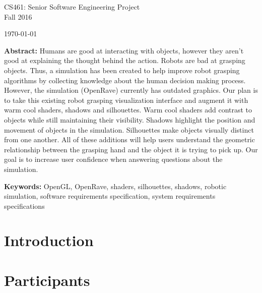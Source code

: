 \documentclass[10pt,journal,compsoc]{IEEEtran}
\begin{document}
\begin{titlepage}
\begin{flushleft}
\begin{bfseries}
\end{bfseries}

\vspace{15mm}
\Large{CS461: Senior Software Engineering Project} \\
\Large{Fall 2016} \\

\vspace{10mm}

\today

\vfill

\begin{large}
{\bf Abstract:}
Humans are good at interacting with objects, however they aren't good at explaining the thought behind the action.
Robots are bad at grasping objects.
Thus, a simulation has been created to help improve robot grasping algorithms by collecting knowledge about the human decision making process.
However, the simulation (OpenRave) currently has outdated graphics.
Our plan is to take this existing robot grasping visualization interface and augment it with warm cool shaders, shadows and silhouettes.
Warm cool shaders add contrast to objects while still maintaining their visibility.
Shadows highlight the position and movement of objects in the simulation.
Silhouettes make objects visually distinct from one another.
All of these additions will help users understand the geometric relationship between the grasping hand and the object it is trying to pick up. 
Our goal is to increase user confidence when answering questions about the simulation.

{\bf Keywords:} OpenGL, OpenRave, shaders, silhouettes, shadows, robotic simulation,
software requirements specification, system requirements specifications
\end{large}
\end{flushleft}

\newpage


\end{titlepage}

\section*{Introduction}


\section*{Participants}

\newpage

\tableofcontents
\end{document}
